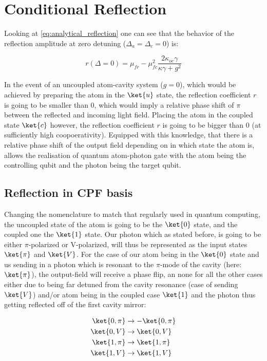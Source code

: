 \section{Conditional Reflection}

Looking at \eqref{eq:analytical_reflection} one can see that the behavior of the reflection amplitude at zero detuning ($\Delta_a=\Delta_c=0$) is:

\begin{equation}
    r(\Delta = 0) = \mu_{fr} - \mu_{fc}^2\frac{2\kappa_{oc}\gamma}{\kappa\gamma + g^2}
    \label{eq:analytical_reflection_zero_detuning}
\end{equation}

In the event of an uncoupled atom-cavity system ($g=0$), which would be achieved by preparing the atom in the $\ket{u}$ state, the reflection coefficient $r$ is going to be smaller than 0, which would imply a relative phase shift of $\pi$ between the reflected and incoming light field. Placing the atom in the coupled state $\ket{c}$ however, the reflection coefficient $r$ is going to be bigger than 0 (at sufficiently high coopoerativity). Equipped with this knowledge, that there is a relative phase shift of the output field depending on in which state the atom is, allows the realisation of quantum atom-photon gate with the atom being the controlling qubit and the photon being the target qubit.\cite{DuanKimble2004}

\subsection{Reflection in CPF basis}

Changing the nomenclature to match that regularly used in quantum computing, the uncoupled state of the atom is going to be the $\ket{0}$ state, and the coupled one the $\ket{1}$ state. Our photon which as stated before, is going to be either $\pi\text{-polarized}$ or V-polarized, will thus be represented as the input states $\ket{\pi}$ and $\ket{V}$. For the case of our atom being in the $\ket{0}$ state and us sending in a photon which is resonant to the $\pi\text{-mode}$ of the cavity (here: $\ket{\pi}$), the output-field will receive a phase flip, an none for all the other cases either due to being far detuned from the cavity resonance (case of sending $\ket{V}$) and/or atom being in the coupled case $\ket{1}$ and the photon thus getting reflected off of the first cavity mirror:

\begin{align*}
    \ket{0,\pi}&\rightarrow-\ket{0,\pi}\\
    \ket{0,V}&\rightarrow\ket{0,V}\\
    \ket{1,\pi}&\rightarrow\ket{1,\pi}\\
    \ket{1,V}&\rightarrow\ket{1,V}\\
\end{align*}

